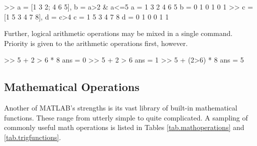 \begin{codex}
>> a = [1 3 2; 4 6 5], b = a>2 & a<=5
a =
    1   3   2
    4   6   5
b =
    0   1   0
    1   0   1
>> c = [1 5 3 4 7 8], d = c>4
c =
    1   5   3   4   7   8
d =
    0   1   0   0   1   1
\end{codex}

\par
Further, logical arithmetic operations may be mixed in a single command.  Priority is given to the arithmetic operations first, however.

\begin{codex}
>> 5 + 2 > 6 * 8
ans =
    0
>> 5 + 2 > 6
ans =
    1
>> 5 + (2>6) * 8
ans =
    5
\end{codex}

\subsection{Mathematical Operations} \label{sec.matlab.mathop}
Another of MATLAB's strengths is its vast library of built-in mathematical functions.  These range from utterly simple to quite complicated.  A sampling of commonly useful math operations is listed in Tables \ref{tab.mathoperations} and \ref{tab.trigfunctions}.

